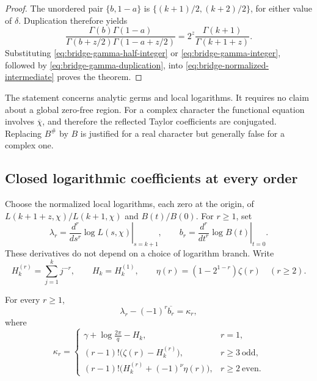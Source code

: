 \begin{proof}
The unordered pair \(\{b,1-a\}\) is
\(\{(k+1)/2,(k+2)/2\}\), for either value of \(\delta\).
Duplication therefore yields
\begin{equation}
 \frac{\Gamma(b)\Gamma(1-a)}
 {\Gamma(b+z/2)\Gamma(1-a+z/2)}
 =2^z\frac{\Gamma(k+1)}{\Gamma(k+1+z)}.
 \label{eq:bridge-gamma-duplication}
\end{equation}
Substituting \eqref{eq:bridge-gamma-half-integer} or
\eqref{eq:bridge-gamma-integer}, followed by
\eqref{eq:bridge-gamma-duplication}, into
\eqref{eq:bridge-normalized-intermediate} proves the theorem.
\end{proof}

\begin{remark}
The statement concerns analytic germs and local logarithms.
It requires no claim about a global zero-free region.
For a complex character the functional equation involves
\(\overline\chi\), and therefore the reflected Taylor coefficients
are conjugated. Replacing \(B^\#\) by \(B\) is justified for a real
character but generally false for a complex one.
\end{remark}

\subsection{Closed logarithmic coefficients at every order}

Choose the normalized local logarithms, each zero at the origin,
of \(L(k+1+z,\chi)/L(k+1,\chi)\) and \(B(t)/B(0)\).
For \(r\geq1\), set
\[
 \lambda_r=
 \left.\frac{d^r}{ds^r}\log L(s,\chi)\right|_{s=k+1},
 \qquad
 b_r=
 \left.\frac{d^r}{dt^r}\log B(t)\right|_{t=0}.
\]
These derivatives do not depend on a choice of logarithm branch.
Write
\[
 H_k^{(r)}=\sum_{j=1}^{k}j^{-r},\qquad H_k=H_k^{(1)},
 \qquad
 \eta(r)=(1-2^{1-r})\zeta(r)\quad(r\geq2).
\]

\begin{theorem}
\label{thm:bridge-log-jets}
For every \(r\geq1\),
\begin{equation}
 \lambda_r-(-1)^r\overline{b_r}=\kappa_r,
 \label{eq:bridge-log-jets}
\end{equation}
where
\begin{equation}
 \kappa_r=
 \begin{cases}
 \displaystyle\gamma+\log\frac{2\pi}{q}-H_k,
       &r=1,\\[4pt]
 \displaystyle(r-1)!\bigl(\zeta(r)-H_k^{(r)}\bigr),
       &r\geq3\ \text{odd},\\[4pt]
 \displaystyle(r-1)!\bigl(H_k^{(r)}+(-1)^\nu\eta(r)\bigr),
       &r\geq2\ \text{even}.
 \end{cases}
 \label{eq:bridge-kappa}
\end{equation}
\end{theorem}

